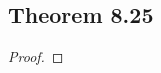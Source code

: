 \documentclass[../../main.tex]{subfiles}
\begin{document}
\subsection{Theorem 8.25}
\begin{wts}

\end{wts}
\begin{proof}

\end{proof}
\end{document}
